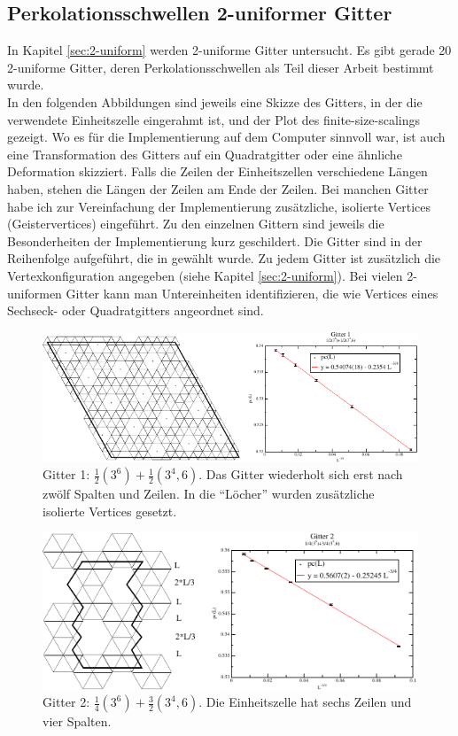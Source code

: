 \subsection{Perkolationsschwellen 2-uniformer Gitter}
\label{sec:numerik2-uniform}
In Kapitel \ref{sec:2-uniform} werden 2-uniforme Gitter \cite{Gruenbaum:86} untersucht. Es gibt gerade 20 2-uniforme Gitter, deren Perkolationsschwellen als Teil dieser Arbeit bestimmt wurde.\\
In den folgenden Abbildungen sind jeweils eine Skizze des Gitters, in der die verwendete Einheitszelle eingerahmt ist, und der Plot des finite-size-scalings gezeigt. Wo es f\"ur die Implementierung auf dem Computer sinnvoll war, ist auch eine Transformation des Gitters auf ein Quadratgitter oder eine \"ahnliche Deformation skizziert. Falls die Zeilen der Einheitszellen verschiedene L\"angen haben, stehen die L\"angen der Zeilen am Ende der Zeilen. Bei manchen Gitter habe ich zur Vereinfachung der Implementierung zus\"atzliche, isolierte Vertices (Geistervertices) eingef\"uhrt. Zu den einzelnen Gittern sind jeweils die Besonderheiten der Implementierung kurz geschildert. Die Gitter sind in der Reihenfolge aufgef\"uhrt, die in \cite{Gruenbaum:86} gew\"ahlt wurde. Zu jedem Gitter ist zus\"atzlich die Vertexkonfiguration angegeben (siehe Kapitel \ref{sec:2-uniform}). Bei vielen 2-uniformen Gitter kann man Untereinheiten identifizieren, die wie Vertices eines Sechseck- oder Quadratgitters angeordnet sind. 
\begin{figure}[bp]
  \includegraphics{./Numerik-figs/2-uni-1_fig}
  \caption{Gitter 1: $\frac{1}{2}(3^6)+\frac{1}{2}(3^4,6)$. Das Gitter wiederholt sich erst nach zw\"olf Spalten und Zeilen. In die ``L\"ocher'' wurden zus\"atzliche isolierte Vertices gesetzt.}
\end{figure}
\begin{figure}[bp]
  \includegraphics{./Numerik-figs/2-uni-2_fig}
  \caption{Gitter 2: $\frac{1}{4}(3^6)+\frac{3}{2}(3^4,6)$. Die Einheitszelle hat sechs Zeilen und vier Spalten. }
\end{figure}
